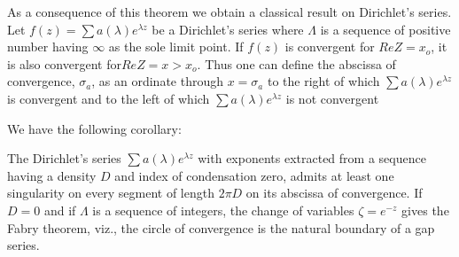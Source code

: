  As a consequence of this theorem we obtain a classical result on
 Dirichlet's series. Let $f (z) = \sum a(\lambda) e^{\lambda z}$ be
 a Dirichlet's series where $\Lambda$ is a sequence of positive
 number having $\infty$ as the sole limit point. If $f (z)$ is
 convergent for $Re Z = x_o $, it is also convergent for\pageoriginale $Re Z = x
 > x_o$. Thus one can define the abscissa of convergence, 
 $\sigma_a$, as an ordinate through $x =\sigma_a$ to the right of
 which $\sum a (\lambda ) e^{\lambda z}$ is convergent and to the
 left of which $\sum a (\lambda)e^{\lambda z}$ is not convergent 

 We have the following corollary:
 \begin{coro*}
 The Dirichlet's series $\sum a (\lambda) e^{\lambda z}$ with
 exponents extracted from a sequence having a density $D$ and
 index of condensation zero, admits at least one singularity on
 every segment of length $2 \pi D$ on its abscissa of
 convergence. If $D = 0$ and if $ \Lambda$ is a sequence of
 integers, the change of variables $\zeta = e^{-z}$ gives the Fabry
 theorem, viz., the circle of convergence is the natural boundary
 of a gap series. 
 \end{coro*}
 
